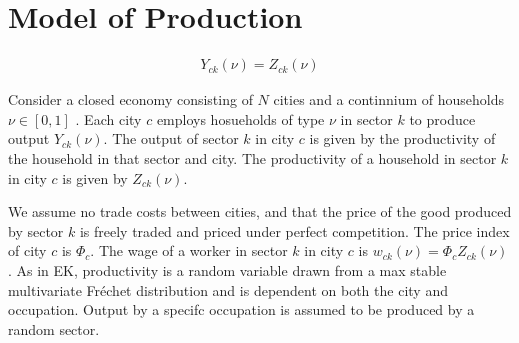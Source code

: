 \documentclass[10pt]{article}
\begin{document}





\section{Model of Production}

\begin{align}
    Y_{ck} (\nu) = Z_{ck}(\nu)
\end{align}

Consider a closed economy consisting of $N$ cities and a continnium of households $\nu \in [0, 1]$ . Each city $c$ employs hosueholds of type $\nu$ in sector $k$ to produce output $Y_{ck}(\nu)$. The output of sector $k$ in city $c$ is given by the productivity of the household in that sector and city. The productivity of a household in sector $k$ in city $c$ is given by $Z_{ck}(\nu)$.

We assume no trade costs between cities, and that the price of the good produced by sector $k$ is freely traded and priced under perfect competition. The price index of city $c$ is $\Phi_c$. The wage of a worker in sector $k$ in city $c$ is $w_{ck}(\nu) = \Phi_c Z_{ck}(\nu)$. As in EK, productivity is a random variable drawn from a max stable multivariate Fréchet distribution and is dependent on both the city and occupation. Output by a specifc occupation is assumed to be produced by a random sector.


\end{document}

